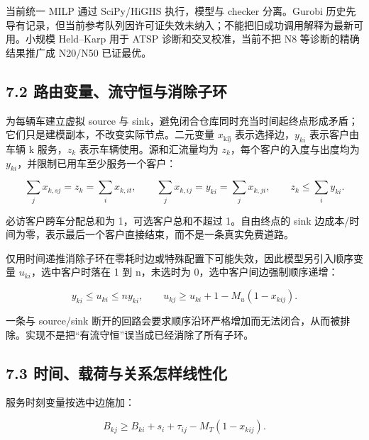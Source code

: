 \documentclass[UTF8,10pt,a4paper,fontset=fandol]{ctexart}
\begin{document}
当前统一 MILP 通过 SciPy/\allowbreak{}HiGHS 执行，模型与 checker 分离。Gurobi 历史先导有记录，但当前参考队列因许可证失效未纳入；不能把旧成功调用解释为最新可用。小规模 Held–Karp 用于 ATSP 诊断和交叉校准，当前不把 N8 等诊断的精确结果推广成 N20/\allowbreak{}N50 已证最优。


\subsection*{7.2 路由变量、流守恒与消除子环}


为每辆车建立虚拟 source 与 sink，避免闭合仓库同时充当时间起终点形成矛盾；它们只是建模副本，不改变实际节点。二元变量 \ensuremath{x_{\mathrm{kij}}} 表示选择边，\ensuremath{y_{ki}} 表示客户由车辆 k 服务，\ensuremath{z_{k}} 表示车辆使用。源和汇流量均为 \ensuremath{z_{k}}，每个客户的入度与出度均为 \ensuremath{y_{ki}}，并限制已用车至少服务一个客户：


\begin{equation}
\sum_jx_{k,sj}=z_k=\sum_ix_{k,it},\qquad
\sum_jx_{k,ij}=y_{ki}=\sum_jx_{k,ji},
\qquad z_k\le\sum_i y_{ki}.
\end{equation}

必访客户跨车分配总和为 1，可选客户总和不超过 1。自由终点的 sink 边成本/\allowbreak{}时间为零，表示最后一个客户直接结束，而不是一条真实免费道路。


仅用时间递推消除子环在零耗时边或特殊配置下可能失效，因此模型另引入顺序变量 \ensuremath{u_{ki}}，选中客户时落在 1 到 n，未选时为 0，选中客户间边强制顺序递增：


\begin{equation}
y_{ki}\le u_{ki}\le ny_{ki},\qquad
u_{kj}\ge u_{ki}+1-M_u(1-x_{kij}).
\end{equation}

一条与 source/\allowbreak{}sink 断开的回路会要求顺序沿环严格增加而无法闭合，从而被排除。实现不是把“有流守恒”误当成已经消除了所有子环。


\subsection*{7.3 时间、载荷与关系怎样线性化}


服务时刻变量按选中边施加：


\begin{equation}
B_{kj}\ge B_{ki}+s_i+\tau_{ij}-M_T(1-x_{kij}).
\end{equation}
\end{document}
